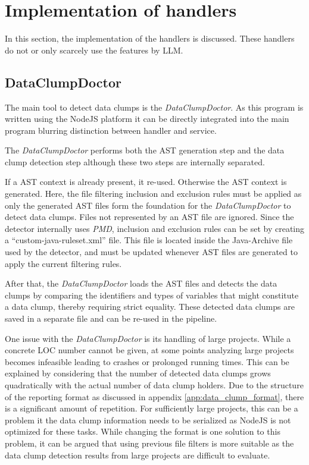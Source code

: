 \section{Implementation of handlers} \label{sec:step_impl}
In this section, the implementation of the handlers is discussed. These handlers do not or only scarcely use the features by \ac{LLM}. 
\subsection{DataClumpDoctor}

The main tool to detect  data clumps is the \textit{DataClumpDoctor}. As this program is written using the NodeJS platform it can be directly integrated into the main program blurring distinction between handler and service.

The \textit{DataClumpDoctor} performs both the \ac{AST} generation step and the data clump detection step although these two steps are internally separated.

If a \ac{AST} context is already present, it re-used. Otherwise the \ac{AST} context is generated. Here, the file filtering inclusion and exclusion rules must be applied as only the generated \ac{AST} files form the foundation for the \textit{DataClumpDoctor} to detect data clumps. Files  not represented by an \ac{AST} file are ignored. Since the detector internally uses \textit{PMD}, inclusion and exclusion rules can be set by creating a \enquote{custom-java-ruleset.xml} file. This file is located inside the Java-Archive file used by the detector, and must be updated whenever \ac{AST} files are generated to apply the current filtering rules. 

After that, the \textit{DataClumpDoctor} loads the \ac{AST} files and detects the data clumps by comparing the identifiers and types of variables that might constitute a data clump, thereby requiring strict equality. These detected data clumps are saved in a separate file and can be re-used in the pipeline. 

One issue with the \textit{DataClumpDoctor} is its handling of large projects. While a concrete \ac{LOC} number cannot be given, at some points analyzing large projects becomes infeasible leading to crashes or prolonged running times. This can be explained by considering that  the number of detected data clumps grows quadratically with the actual number of data clump holders. Due to the structure of the reporting format as discussed in appendix \ref{app:data_clump_format}, there is a significant amount of repetition. For sufficiently large projects, this can be a problem it the data clump information needs to be serialized as NodeJS is not optimized for these tasks. While changing the format is one solution to this problem, it can be argued that using previous file filters is more suitable as the data clump detection results from large projects are difficult to evaluate. 

